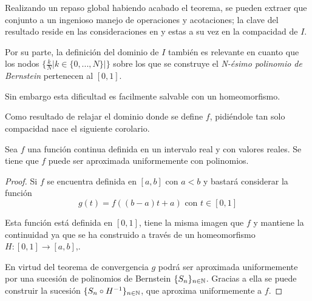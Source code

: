 %

Realizando un repaso global habiendo acabado el teorema, se pueden extraer que conjunto a un ingenioso manejo de operaciones y acotaciones; la clave del resultado reside  en las consideraciones
en   y estas a su vez en la 
compacidad de $I$.

Por su parte, la definición del dominio de $I$ también es relevante en 
cuanto que los nodos $\{ \frac{k}{N} | k\in \{0,..., N\} |  \}$ sobre los que se construye el \textit{N-ésimo polinomio de Bernstein} pertenecen al $[0,1]$.

Sin embargo esta dificultad es facilmente salvable con un homeomorfismo. 

Como resultado de relajar el dominio donde se define $f$, pidiéndole tan solo
compacidad nace el siguiente corolario.  

\begin{corolario}
    Sea $f$ una función continua definida en un intervalo real y con valores reales. Se tiene que $f$ puede ser aproximada uniformemente con polinomios. 
\end{corolario}  

\begin{proof}
    Si $f$ se encuentra definida en $[a,b]$ con $a<b$ y bastará considerar la función
    \begin{equation*}
        g(t) = f( (b-a)t + a) \text{ con } t \in [0,1]
    \end{equation*}

    Esta función está definida en $[0,1]$, tiene la misma imagen que $f$ y 
    mantiene la continuidad ya que se ha construido a través de un homeomorfismo 
    $H:[0,1] \longrightarrow [a,b]$,. 

    En virtud del teorema de convergencia 
    $g$ podrá ser aproximada uniformemente por una sucesión de polinomios de Bernstein $\{S_n\}_{n \in \mathbb{N}}$. Gracias a ella se puede
    construir la sucesión $\{S_n \circ H^{-1}\}_{n \in \mathbb{N}}$, que aproxima uniformemente a $f$. 
\end{proof}